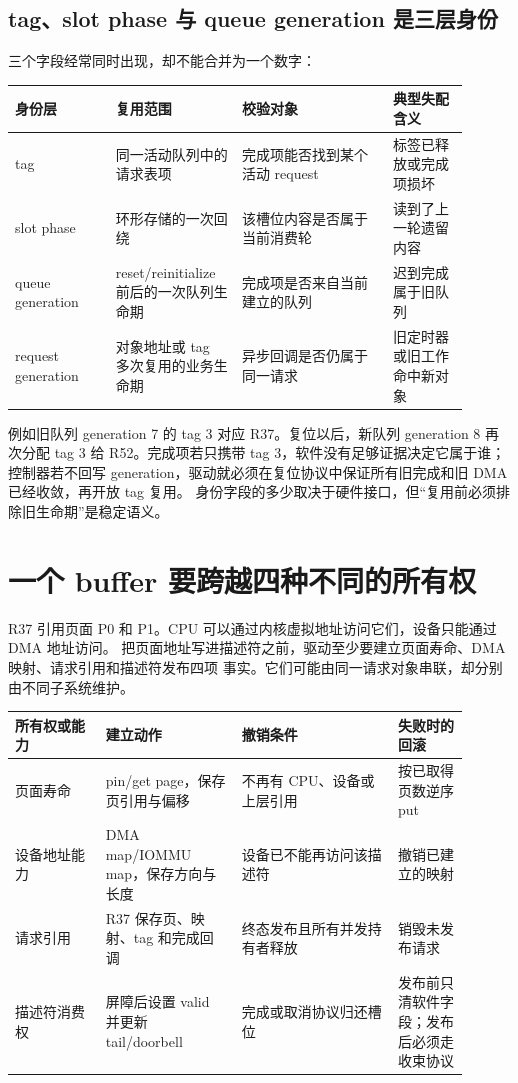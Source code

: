 \subsection{tag、slot phase 与 queue generation 是三层身份}

三个字段经常同时出现，却不能合并为一个数字：

\begin{longtable}{|L{0.2\linewidth}|L{0.25\linewidth}|L{0.3\linewidth}|L{0.15\linewidth}|}
\hline
身份层 & 复用范围 & 校验对象 & 典型失配含义 \\ \hline
tag & 同一活动队列中的请求表项 & 完成项能否找到某个活动 request &
标签已释放或完成项损坏 \\\tablerowrule
slot phase & 环形存储的一次回绕 & 该槽位内容是否属于当前消费轮 &
读到了上一轮遗留内容 \\\tablerowrule
queue generation & reset/reinitialize 前后的一次队列生命期 &
完成项是否来自当前建立的队列 & 迟到完成属于旧队列 \\\tablerowrule
request generation & 对象地址或 tag 多次复用的业务生命期 &
异步回调是否仍属于同一请求 & 旧定时器或旧工作命中新对象 \\ \hline
\end{longtable}

例如旧队列 generation 7 的 tag 3 对应 R37。复位以后，新队列 generation 8 再次分配
tag 3 给 R52。完成项若只携带 tag 3，软件没有足够证据决定它属于谁；控制器若不回写
generation，驱动就必须在复位协议中保证所有旧完成和旧 DMA 已经收敛，再开放 tag 复用。
身份字段的多少取决于硬件接口，但“复用前必须排除旧生命期”是稳定语义。

\section{一个 buffer 要跨越四种不同的所有权}

R37 引用页面 P0 和 P1。CPU 可以通过内核虚拟地址访问它们，设备只能通过 DMA 地址访问。
把页面地址写进描述符之前，驱动至少要建立页面寿命、DMA 映射、请求引用和描述符发布四项
事实。它们可能由同一请求对象串联，却分别由不同子系统维护。

\begin{longtable}{|L{0.18\linewidth}|L{0.27\linewidth}|L{0.31\linewidth}|L{0.14\linewidth}|}
\hline
所有权或能力 & 建立动作 & 撤销条件 & 失败时的回滚 \\ \hline
页面寿命 & pin/get page，保存页引用与偏移 & 不再有 CPU、设备或上层引用 &
按已取得页数逆序 put \\\tablerowrule
设备地址能力 & DMA map/IOMMU map，保存方向与长度 & 设备已不能再访问该描述符 &
撤销已建立的映射 \\\tablerowrule
请求引用 & R37 保存页、映射、tag 和完成回调 & 终态发布且所有并发持有者释放 &
销毁未发布请求 \\\tablerowrule
描述符消费权 & 屏障后设置 valid 并更新 tail/doorbell & 完成或取消协议归还槽位 &
发布前只清软件字段；发布后必须走收束协议 \\ \hline
\end{longtable}

